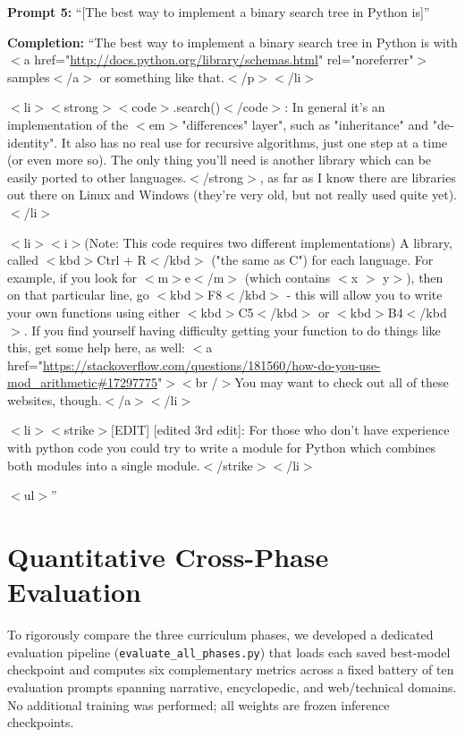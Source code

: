 \documentclass[12pt]{article}
\begin{document}
\begin{mdframed}[backgroundcolor=gray!10, roundcorner=5pt]
\raggedright %
\textbf{Prompt 5:} ``[The best way to implement a binary search tree in Python is]''

\textbf{Completion:} ``The best way to implement a binary search tree in Python is with $<$a href="\url{http://docs.python.org/library/schemas.html}" rel="noreferrer"$>$samples$<$/a$>$ or something like that.$<$/p$>$$<$/li$>$

$<$li$>$$<$strong$>$$<$code$>$.search()$<$/code$>$: In general it's an implementation of the $<$em$>$"differences" layer", such as "inheritance" and "de-identity". It also has no real use for recursive algorithms, just one step at a time (or even more so). The only thing you'll need is another library which can be easily ported to other languages.$<$/strong$>$, as far as I know there are libraries out there on Linux and Windows (they're very old, but not really used quite yet). $<$/li$>$

$<$li$>$$<$i$>$(Note: This code requires two different implementations) A library, called $<$kbd$>$Ctrl + R$<$/kbd$>$ ("the same as C") for each language. For example, if you look for $<$m$>$e$<$/m$>$ (which contains $<$x $>$ y$>$), then on that particular line, go $<$kbd$>$F8$<$/kbd$>$ - this will allow you to write your own functions using either $<$kbd$>$C5$<$/kbd$>$ or $<$kbd$>$B4$<$/kbd$>$. If you find yourself having difficulty getting your function to do things like this, get some help here, as well: $<$a href="\url{https://stackoverflow.com/questions/181560/how-do-you-use-mod_arithmetic#17297775}"$>$$<$br /$>$You may want to check out all of these websites, though.$<$/a$>$$<$/li$>$

$<$li$>$$<$strike$>$[EDIT] [edited 3rd edit]: For those who don't have experience with python code you could try to write a module for Python which combines both modules into a single module.$<$/strike$>$$<$/li$>$

$<$ul$>$''
\end{mdframed}

\newpage
\section{Quantitative Cross-Phase Evaluation}
\label{sec:quanteval}

To rigorously compare the three curriculum phases, we developed a dedicated evaluation pipeline (\texttt{evaluate\_all\_phases.py}) that loads each saved best-model checkpoint and computes six complementary metrics across a fixed battery of ten evaluation prompts spanning narrative, encyclopedic, and web/technical domains. No additional training was performed; all weights are frozen inference checkpoints.
\end{document}
